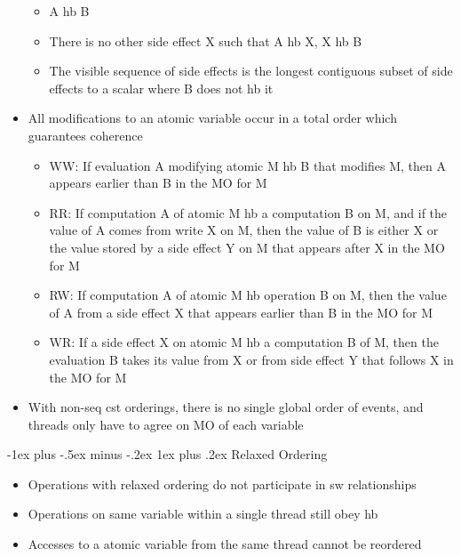 \documentclass[10pt, landscape]{article}
\makeatletter
\renewcommand{\subsection}{\@startsection{subsection}{3}{0mm}%
                                {-1ex plus -.5ex minus -.2ex}%
                                {1ex plus .2ex}%
                                {\normalfont\small\bfseries}}%
\makeatother
\begin{document}
\begin{multicols*}{3}
\begin{itemize}
\begin{itemize}
        \item A hb B
        \item There is no other side effect X such that A hb X, X hb B
        \item The visible sequence of side effects is the longest contiguous subset of side effects to a scalar where B does not hb it
    \end{itemize}
    \item All modifications to an atomic variable occur in a total order which guarantees coherence
    \begin{itemize}
        \item WW: If evaluation A modifying atomic M hb B that modifies M, then A appears earlier than B in the MO for M
        \item RR: If computation A of atomic M hb a computation B on M, and if the value of A comes from write X on M, then the value of B is either X or the value stored by a side effect Y on M that appears after X in the MO for M
        \item RW: If computation A of atomic M hb operation B on M, then the value of A from a side effect X that appears earlier than B in the MO for M
        \item WR: If a side effect X on atomic M hb a computation B of M, then the evaluation B takes its value from X or from side effect Y that follows X in the MO for M
    \end{itemize}
    \item With non-seq cst orderings, there is no single global order of events, and threads only have to agree on MO of each variable
\end{itemize}

\subsection{Relaxed Ordering}
\begin{itemize}
    \item Operations with relaxed ordering do not participate in sw relationships
    \item Operations on same variable within a single thread still obey hb
    \item Accesses to a atomic variable from the same thread cannot be reordered
\end{itemize}


\end{multicols*}
\end{document}
